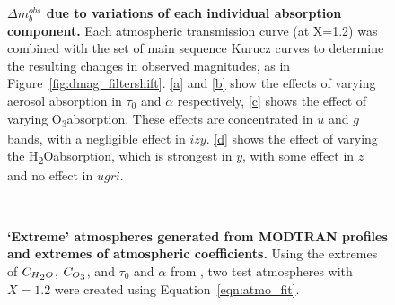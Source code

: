 \documentclass[12pt,preprint]{aastex}
\newcommand{\water}   {H\textsubscript{2}O}
\newcommand{\ozone}    {O\textsubscript{3}}
\begin{document}
\begin{figure}
\caption{{\small
{\bf $\Delta m_b^{obs}$ due to variations of each
individual absorption component.} Each atmospheric transmission curve
(at X=1.2) was combined with the set of main sequence Kurucz curves to
determine the resulting changes in observed magnitudes, as in
Figure~\ref{fig:dmag_filtershift}. \ref{a} and \ref{b} show the
effects of varying aerosol absorption in $\tau_0$ and $\alpha$
respectively, \ref{c} shows the effect of varying \ozone absorption. These
effects are concentrated in $u$ and $g$ bands, with a negligible effect
in $izy$. \ref{d} shows the effect of varying the \water absorption,
which is strongest in $y$, with some effect in $z$ and no effect in
$ugri$.
}}
\label{fig:dmag_atm_comps}
\end{figure}

\begin{figure}
\centering
{} \\
\caption{{\small  {\bf `Extreme' atmospheres generated from MODTRAN profiles and extremes 
of atmospheric coefficients.} Using the extremes of $C_{\water}$, $C_{\ozone}$,
and $\tau_0$ and $\alpha$ from \citet{Burke2010b}, two test atmospheres
with $X=1.2$ were created using Equation~\ref{eqn:atmo_fit}. }}
\label{fig:atm_changes}
\end{figure}
\end{document}
